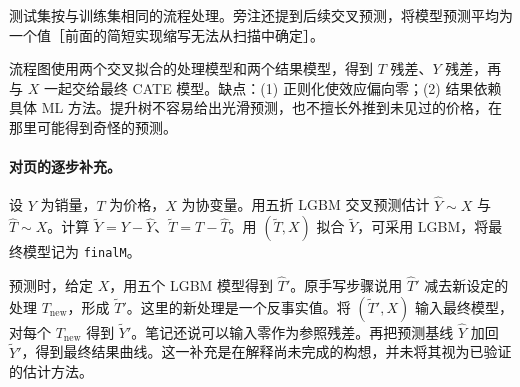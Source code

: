 {测试集按与训练集相同的流程处理。旁注还提到后续交叉预测，将模型预测平均为一个值［前面的简短实现缩写无法从扫描中确定］。

流程图使用两个交叉拟合的处理模型和两个结果模型，得到 $T$ 残差、$Y$ 残差，再与 $X$ 一起交给最终 CATE 模型。缺点：(1) 正则化使效应偏向零；(2) 结果依赖具体 ML 方法。提升树不容易给出光滑预测，也不擅长外推到未见过的价格，在那里可能得到奇怪的预测。

\paragraph{对页的逐步补充。}
设 $Y$ 为销量，$T$ 为价格，$X$ 为协变量。用五折 LGBM 交叉预测估计 $\hat Y\sim X$ 与 $\hat T\sim X$。计算 $\widetilde Y=Y-\hat Y$、$\widetilde T=T-\hat T$。用 $(\widetilde T,X)$ 拟合 $\widetilde Y$，可采用 LGBM，将最终模型记为 \texttt{finalM}。

预测时，给定 $X$，用五个 LGBM 模型得到 $\hat T'$。原手写步骤说用 $\hat T'$ 减去新设定的处理 $T_{\mathrm{new}}$，形成 $\widetilde T'$。这里的新处理是一个反事实值。将 $(\widetilde T',X)$ 输入最终模型，对每个 $T_{\mathrm{new}}$ 得到 $\widetilde Y'$。笔记还说可以输入零作为参照残差。再把预测基线 $\hat Y$ 加回 $\widetilde Y'$，得到最终结果曲线。这一补充是在解释尚未完成的构想，并未将其视为已验证的估计方法。

\begin{center}
\end{center}}
